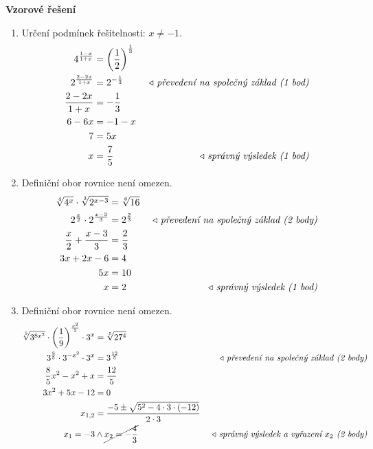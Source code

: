 \begin{center}
\Large\textbf{Vzorové řešení}\normalsize
\begin{enumerate}
    \item Určení podmínek řešitelnosti: $x\neq -1$.
    \begin{align*}
        \begin{aligned}
            4^{\frac{1-x}{1+x}}&=\left(\frac{1}{2}\right)^{\frac{1}{3}} & \\
            2^{\frac{2-2x}{1+x}}&=2^{-\frac{1}{3}} & \text{\rightnote{převedení na společný základ (1 bod)}}\\
            \frac{2-2x}{1+x}&=-\frac{1}{3} & \\
            6-6x&=-1-x & \\
            7&=5x & \\
            x&=\frac{7}{5} & \text{\rightnote{správný výsledek (1 bod)}}
        \end{aligned}
    \end{align*}
    \item Definiční obor rovnice není omezen.
    \begin{align*}
        \begin{aligned}
            \sqrt[4]{4^x}\cdot \sqrt[3]{2^{x-3}}&=\sqrt[6]{16} & \\
            2^{\frac{x}{2}}\cdot 2^{\frac{x-3}{3}}&=2^{\frac{2}{3}} & \text{\rightnote{převedení na společný základ (2 body)}}\\
            \frac{x}{2}+\frac{x-3}{3}&=\frac{2}{3} & \\
            3x+2x-6&=4 & \\
            5x&=10 & \\
            x&=2 & \text{\rightnote{správný výsledek (1 bod)}}
        \end{aligned}
    \end{align*}
    \item Definiční obor rovnice není omezen.
    \begin{align*}
        \begin{aligned}
            \sqrt[5]{3^{8x^2}}\cdot\left(\frac{1}{9}\right)^{\frac{x^2}{2}}\cdot 3^x&=\sqrt[5]{27^4} & \\
            3^{\frac{8}{5}}\cdot 3^{-x^2}\cdot 3^x&=3^{\frac{12}{5}}& \text{\rightnote{převedení na společný základ (2 body)}}\\
            \frac{8}{5}x^2-x^2+x&=\frac{12}{5} & \\
            3x^2+5x-12&=0 & \\
            x_{1,2}&=\frac{-5\pm\sqrt{5^2-4\cdot 3\cdot (-12)}}{2\cdot 3} & \\
            x_1=-3 &\land \cancel{x_2=-\frac{4}{3}} & \text{\rightnote{správný výsledek a vyřazení $x_2$ (2 body)}} \\
        \end{aligned}
    \end{align*}
\end{enumerate}
\end{center}
